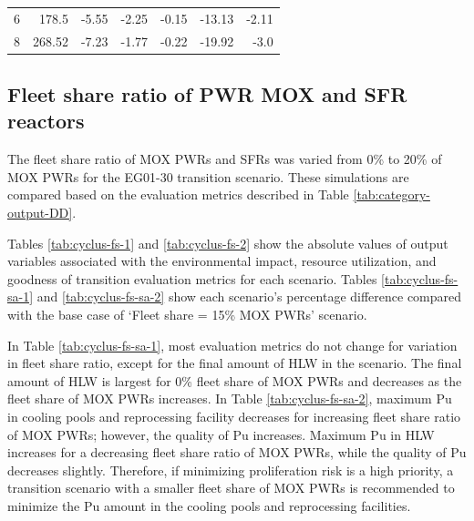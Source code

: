\begin{table}[H]
\begin{tabularx}{\textwidth}{R|RRRRRR}
6  & 178.5            & -5.55                          & -2.25         & -0.15                       & -13.13            & -2.11                           \\
8  & 268.52           & -7.23                          & -1.77         & -0.22                       & -19.92            & -3.0                           \\ \hline
        \end{tabularx}
        \end{table}

\subsection{Fleet share ratio of PWR MOX and SFR reactors}

The fleet share ratio of \gls{MOX} \glspl{PWR} and \glspl{SFR}
was varied from 0\% to 20\% of \gls{MOX} \glspl{PWR} for the 
\Cyclus EG01-30 transition scenario. 
These simulations are compared based on the evaluation 
metrics described in Table \ref{tab:category-output-DD}. 

Tables \ref{tab:cyclus-fs-1} and \ref{tab:cyclus-fs-2} show 
the absolute values of 
output variables associated with the environmental impact, 
resource utilization, and goodness of transition evaluation 
metrics for each scenario. 
Tables \ref{tab:cyclus-fs-sa-1} and \ref{tab:cyclus-fs-sa-2} 
show each scenario's percentage 
difference compared with the base case of `Fleet share = 15\% 
\gls{MOX} \glspl{PWR}' scenario. 

In Table \ref{tab:cyclus-fs-sa-1}, most evaluation metrics do not change 
for variation in fleet share ratio, except for the final 
amount of HLW in the scenario. 
The final amount of HLW is largest for 0\% fleet share of \gls{MOX} 
\glspl{PWR} and decreases as the fleet share of \gls{MOX} \glspl{PWR} 
increases. 
In Table \ref{tab:cyclus-fs-sa-2}, maximum Pu in cooling pools and 
reprocessing facility 
decreases for increasing fleet share ratio of \gls{MOX} \glspl{PWR}; 
however, the quality of Pu increases. 
Maximum Pu in HLW increases for a decreasing fleet share ratio
of \gls{MOX} \glspl{PWR}, while the quality of Pu decreases slightly.
Therefore, if minimizing proliferation risk is a high priority, 
a transition scenario 
with a smaller fleet share of \gls{MOX} \glspl{PWR} is recommended
to minimize the Pu amount in the cooling pools and reprocessing facilities. 

